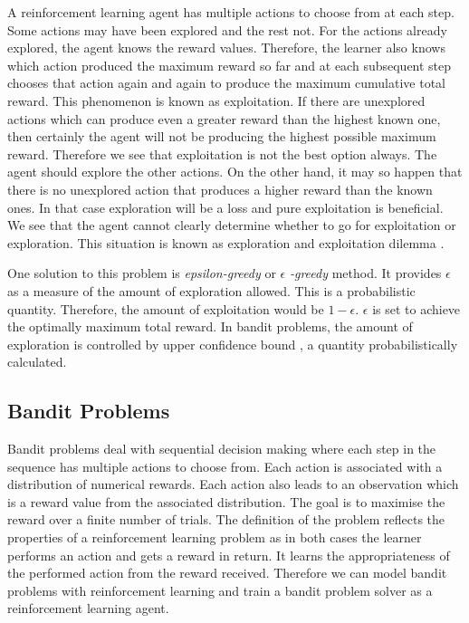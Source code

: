 \documentclass[english]{tktltiki}
\begin{document}
A reinforcement learning agent has multiple actions to choose from at each step. Some actions may have been explored and the rest not. For the actions already explored, the agent knows the reward values. Therefore, the learner also knows which action produced the maximum reward so far and at each subsequent step chooses that action again and again to produce the maximum cumulative total reward. This phenomenon is known as exploitation. If there are unexplored actions which can produce even a greater reward than the highest known one, then certainly the agent will not be producing the highest possible maximum reward. Therefore we see that exploitation is not the best option always. The agent should explore the other actions. On the other hand, it may so happen that there is no unexplored action that produces a higher reward than the known ones. In that case exploration will be a loss and pure exploitation is beneficial. We see that the agent cannot clearly determine whether to go for exploitation or exploration. This situation is known as exploration and exploitation dilemma \cite{reinforcement_learning}.

One solution to this problem is \textit{epsilon-greedy} \cite{reinforcement_learning} or $\epsilon$ \textit{-greedy} method. It provides $\epsilon$ as a measure of the amount of exploration allowed. This is a probabilistic quantity. Therefore, the amount of exploitation would be $1 - \epsilon$. $\epsilon$ is set to achieve the optimally maximum total reward. In bandit problems, the amount of exploration is controlled by upper confidence bound \cite{ucb}, a quantity probabilistically calculated.


\subsection{Bandit Problems}

Bandit problems \cite{bandits} deal with sequential decision making where each step in the sequence has multiple actions to choose from. Each action is associated with a distribution of numerical rewards. Each action also leads to an observation which is a reward value from the associated distribution. The goal is to maximise the reward over a finite number of trials. The definition of the problem reflects the properties of a reinforcement learning problem as in both cases the learner performs an action and gets a reward in return. It learns the appropriateness of the performed action from the reward received. Therefore we can model bandit problems with reinforcement learning and train a bandit problem solver as a reinforcement learning agent.
\end{document}
